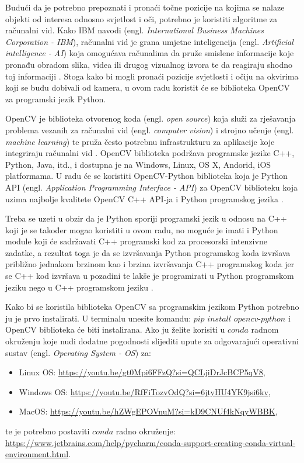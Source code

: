 \documentclass{foi}
\begin{document}
Budući da je potrebno prepoznati i pronaći točne pozicije na kojima se nalaze objekti od interesa odnosno svjetlost i oči, potrebno je koristiti algoritme za računalni vid. Kako IBM navodi (engl. \emph{International Business Machines Corporation - IBM}), računalni vid je grana umjetne inteligencija (engl. \emph{Artificial intelligence - AI}) koja omogućava računalima da pruže smislene informacije koje pronađu obradom slika, videa ili drugog vizualnog izvora te da reagiraju shodno toj informaciji \cite{cv-ibm}. Stoga kako bi mogli pronaći pozicije svjetlosti i očiju na okvirima koji se budu dobivali od kamera, u ovom radu koristit će se biblioteka OpenCV za programski jezik Python.

OpenCV je biblioteka otvorenog koda (engl. \emph{open source}) koja služi za rješavanja problema vezanih za računalni vid (engl. \emph{computer vision}) i strojno učenje (engl. \emph{machine learning}) te pruža često potrebnu infrastrukturu za aplikacije koje integriraju računalni vid \cite{opencv}. OpenCV biblioteka podržava programske jezike C++, Python, Java, itd., i dostupna je na Windows, Linux, OS X, Andorid, iOS platformama. U radu će se koristiti OpenCV-Python biblioteka koja je Python API (engl. \emph{Application Programming Interface - API}) za OpenCV biblioteku koja uzima najbolje kvalitete OpenCV C++ API-ja i Python programskog jezika \cite{opencv-python}.

Treba se uzeti u obzir da je Python sporiji programski jezik u odnosu na C++ koji je se također mogao koristiti u ovom radu, no moguće je imati i Python module koji će sadržavati C++ programski kod za procesorski intenzivne zadatke, a rezultat toga je da se izvršavanja Python programskog koda izvršava približno jednakom brzinom kao i brzina izvršavanja C++ programskog koda jer se C++ kod izvršava u pozadini te lakše je programirati u Python programskom jeziku nego u C++ programskom jeziku \cite{opencv-python}.

Kako bi se koristila biblioteka OpenCV sa programskim jezikom Python potrebno ju je prvo instalirati. U terminalu unesite komandu: $pip$ $install$ $opencv$-$python$ i OpenCV biblioteka će biti instalirana. Ako ju želite korisiti u $conda$ radnom okruženju koje nudi dodatne pogodnosti slijediti upute za odgovarajući operativni sustav (engl. \emph{Operating System - OS}) za:
\newpage
\begin{itemize}[noitemsep]
    \item Linux OS: \url{https://youtu.be/gt0Mpi6FFzQ?si=QCLjiDrJcBCP5qV8},
    \item Windows OS: \url{https://youtu.be/RfFiTozvOdQ?si=6jtyHU4YK9jsi6kv},
    \item MacOS: \url{https://youtu.be/hZWgEPOVnuM?si=kD9CNUf4kNqyWBBK},
\end{itemize}
te je potrebno postaviti $conda$ radno okruženje: \url{https://www.jetbrains.com/help/pycharm/conda-support-creating-conda-virtual-environment.html}.
\end{document}
